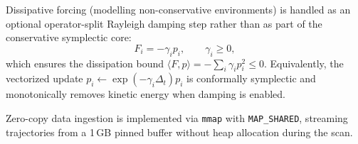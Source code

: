 \documentclass[10pt,twocolumn]{article}
\begin{document}
Dissipative forcing (modelling non-conservative environments) is handled as
an optional operator-split Rayleigh damping step rather than as part of the
conservative symplectic core:
\begin{equation}
  F_i = -\gamma_i p_i,\qquad \gamma_i\ge 0,
  \label{eq:dissipation}
\end{equation}
which ensures the dissipation bound
$\langle F, p\rangle = -\sum_i\gamma_i p_i^2 \le 0$.
Equivalently, the vectorized update
$p_i\leftarrow \exp(-\gamma_i\Delta_t)p_i$ is conformally symplectic and
monotonically removes kinetic energy when damping is enabled.

Zero-copy data ingestion is implemented via \texttt{mmap}
with \texttt{MAP\_SHARED}, streaming trajectories from a 1\,GB
pinned buffer without heap allocation during the scan.

\begin{figure}[t]
\small
\centering
{}
\end{figure}
\end{document}
